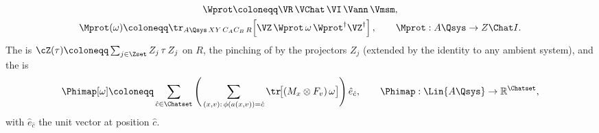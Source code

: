 \begin{definition}
\begin{equation}
\begin{gathered}
  \Wprot\coloneqq\VR\,\VChat\,\VI\,\Vann\,\Vmsm,\\
  \Mprot(\omega)\coloneqq
  \tr_{A\Qsys\,XY\,C_AC_B\,R}\!\left[\VZ\,\Wprot\,\omega\,\Wprot^{\dagger}
  \VZ^{\dagger}\right],
  \qquad \Mprot: A\Qsys\to Z\Chat I .
\end{gathered}
\end{equation}
The
is $\cZ(\tau)\coloneqq\sum_{j\in\Zset}Z_j\,\tau\,Z_j$ on $R$, the pinching
of  by the projectors $Z_j$ (extended by the
identity to any ambient system), and the
is
\begin{equation}\label{eq:Phimap}
  \Phimap[\omega]\coloneqq\sum_{\hat c\in\Chatset}
  \Bigg(\sum_{(x,v):\,\phi(a(x,v))=\hat c}
  \tr\!\big[(M_x\otimes F_v)\,\omega\big]\Bigg)\,\hat e_{\hat c},
  \qquad \Phimap:\Lin{A\Qsys}\to\mathbb{R}^{\Chatset},
\end{equation}
with $\hat e_{\hat c}$ the unit vector at position $\hat c$.
\end{definition}
